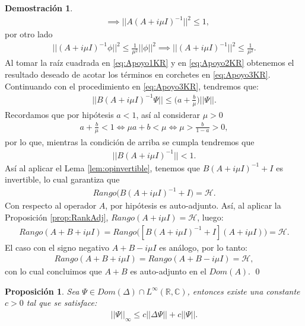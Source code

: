 \documentclass[12pt]{article}
\newtheorem{prop}[teo]{Proposición}
\theoremstyle{definition}
\newtheorem*{demo}{Demostración}
\newcommand*{\field}[1]{\mathbb{#1}}
\begin{document}
\begin{demo}
\begin{align}
        & \implies
        ||A(A+i\mu I)^{-1}||^2 \leq 1,
        \label{eq:Apoyo1KR}
    \end{align}
    por otro lado
    \begin{align}
        ||(A+i\mu I)^{-1}\phi||^2 \leq \frac{1}{\mu^2}||\phi||^2
        \implies
        ||(A+i\mu I)^{-1}||^2 \leq \frac{1}{\mu^2}.
        \label{eq:Apoyo2KR}
    \end{align}
    Al tomar la raíz cuadrada en \eqref{eq:Apoyo1KR} y en \eqref{eq:Apoyo2KR} obtenemos el resultado deseado de acotar los términos en corchetes en \eqref{eq:Apoyo3KR}. Continuando con el procedimiento en \eqref{eq:Apoyo3KR}, tendremos que:
    \begin{align*}
        ||B(A+i\mu I)^{-1}\Psi|| \leq \bigg(a + \frac{b}{\mu}\bigg)||\Psi||.
    \end{align*}
    Recordamos que por hipótesis $a<1$, así al considerar $\mu>0$
    \begin{align*}
        a + \frac{b}{\mu} < 1 \Longleftrightarrow \mu a + b < \mu \Longleftrightarrow
        \mu > \frac{b}{1-a}>0,
    \end{align*}
    por lo que, mientras la condición de arriba se cumpla tendremos que
    \begin{align*}
        ||B(A+i\mu I)^{-1}|| < 1.
    \end{align*}
 Así al aplicar el Lema \ref{lem:opinvertible}, tenemos que $B(A+i\mu I)^{-1} + I$ es invertible, lo cual garantiza que
    \begin{align*}
        Rango\big(B(A+i\mu I)^{-1} + I\big) = \mathcal{H}.
    \end{align*}
    Con respecto al operador $A$, por hipótesis es auto-adjunto. Así, al aplicar la Proposición \ref{prop:RankAdj}, $Rango(A+i\mu I) = \mathcal{H}$, luego:
    \begin{align*}
    Rango(A+B+i\mu I) = Rango\big([B(A+i\mu I)^{-1} + I](A+i\mu I)\big)=\mathcal{H}.
    \end{align*}
    El caso con el signo negativo $A+B-i\mu I$ es análogo, por lo tanto:
    \begin{align*}
    Rango(A+B+i\mu I) = Rango(A+B-i\mu I)=\mathcal{H},
    \end{align*}
    con lo cual concluimos que $A+B$ es auto-adjunto en el $Dom(A)$.
    \qed
\end{demo}
\begin{prop}
     Sea $\Psi\in Dom(\Delta)\cap L^{\infty}(\field{R},\field{C})$, entonces existe una constante $c>0$ tal que se satisface:
    \begin{align*}   ||\Psi||_{\infty} \leq c ||\Delta \Psi|| + c ||\Psi||.
    \end{align*}
    \label{prop:Acotamiento}
\end{prop}
\end{document}
